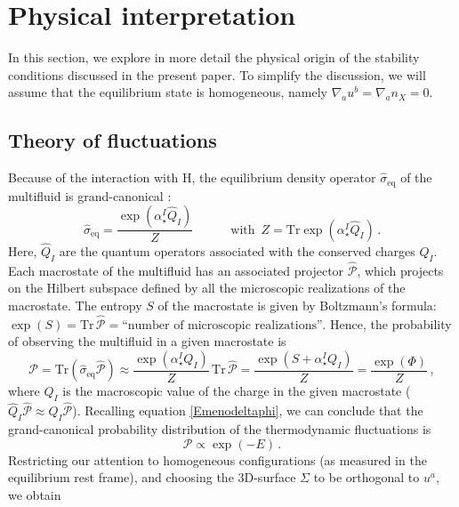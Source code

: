 \documentclass[a4paper, amsfonts, amssymb, amsmath, reprint, showkeys, nofootinbib, twoside, onecolumn,notitlepage]{revtex4-1}
\newcommand{\spc}{\quad \quad \quad}
\theoremstyle{definition}
\theoremstyle{theorem}
\begin{document}
\section{Physical interpretation}

In this section, we explore in more detail the physical origin of the stability conditions discussed in the present paper. To simplify the discussion, we will assume that the equilibrium state is homogeneous, namely $\nabla_a u^b = \nabla_a n_X =0$.


\subsection{Theory of fluctuations}

Because of the interaction with H, the equilibrium density operator $\hat{\sigma}_{\text{eq}}$ of the multifluid is grand-canonical \cite{GibbonsHawking1977}:
\begin{equation}
\hat{\sigma}_{\text{eq}}= \dfrac{\exp(\alpha_\star^I \hat{Q}_I)}{Z} \spc \text{with } \, Z= \text{Tr} \exp(\alpha_\star^I \hat{Q}_I) \, .
\end{equation}
Here, $\hat{Q}_I$ are the quantum operators associated with the conserved charges $Q_I$. Each macrostate of the multifluid has an associated projector $\hat{\mathcal{P}}$, which projects on the Hilbert subspace defined by all the microscopic realizations of the macrostate. The entropy $S$ of the macrostate is given by Boltzmann's formula: $\exp (S)= \text{Tr} \, \hat{\mathcal{P}}= \text{``number of microscopic realizations''}$. Hence, the probability of observing the multifluid in a given macrostate is
\begin{equation}
\mathcal{P} = \text{Tr}(\hat{\sigma}_{\text{eq}} \hat{\mathcal{P}}) \approx \dfrac{\exp(\alpha_\star^I Q_I)}{Z} \, \text{Tr} \, \hat{\mathcal{P}} = \dfrac{\exp(S+\alpha_\star^I Q_I)}{Z} = \dfrac{\exp (\Phi)}{Z} \, ,
\end{equation}
where $Q_I$ is the macroscopic value of the charge in the given macrostate ($\hat{Q}_I \hat{\mathcal{P}} \approx Q_I \hat{\mathcal{P}}$). Recalling equation \eqref{Emenodeltaphi}, we can conclude that the grand-canonical probability distribution of the thermodynamic fluctuations is \cite{GavassinoCausality2021}
\begin{equation}
\mathcal{P} \propto \exp(-E) \, .
\end{equation}
Restricting our attention to homogeneous configurations (as measured in the equilibrium rest frame), and choosing the 3D-surface $\Sigma$ to be orthogonal to $u^a$, we obtain
\end{document}
